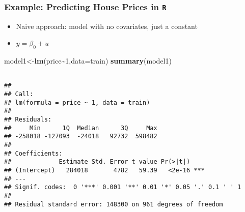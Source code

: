 \documentclass[
  shownotes,
  xcolor={svgnames},
  hyperref={colorlinks,citecolor=DarkBlue,linkcolor=DarkRed,urlcolor=DarkBlue}
  ]{beamer}
\newenvironment{Shaded}{\begin{snugshade}}{\end{snugshade}}
\newcommand{\DataTypeTok}[1]{\textcolor[rgb]{0.13,0.29,0.53}{#1}}
\newcommand{\DecValTok}[1]{\textcolor[rgb]{0.00,0.00,0.81}{#1}}
\newcommand{\KeywordTok}[1]{\textcolor[rgb]{0.13,0.29,0.53}{\textbf{#1}}}
\newcommand{\NormalTok}[1]{#1}
\newcommand{\OperatorTok}[1]{\textcolor[rgb]{0.81,0.36,0.00}{\textbf{#1}}}
\begin{document}
\begin{frame}[fragile]
\frametitle{Example: Predicting House Prices in \texttt{R}}

\begin{itemize}
 \item Naive approach: model with no covariates, just a constant
 \item $y = \beta_0 + u$
\end{itemize}

\begin{Shaded}
\footnotesize
\begin{Highlighting}[]

\NormalTok{model1\textless{}{-}}\KeywordTok{lm}\NormalTok{(price}\OperatorTok{\textasciitilde{}}\DecValTok{1}\NormalTok{,}\DataTypeTok{data=}\NormalTok{train)}
\KeywordTok{summary}\NormalTok{(model1)}
\end{Highlighting}
\end{Shaded}

\begin{tiny}
\begin{verbatim}

## 
## Call:
## lm(formula = price ~ 1, data = train)
## 
## Residuals:
##     Min      1Q  Median      3Q     Max 
## -258018 -127093  -24018   92732  598482 
## 
## Coefficients:
##             Estimate Std. Error t value Pr(>|t|)    
## (Intercept)   284018       4782   59.39   <2e-16 ***
## ---
## Signif. codes:  0 '***' 0.001 '**' 0.01 '*' 0.05 '.' 0.1 ' ' 1
## 
## Residual standard error: 148300 on 961 degrees of freedom
\end{verbatim}
\end{tiny}

\end{frame}
\end{document}
